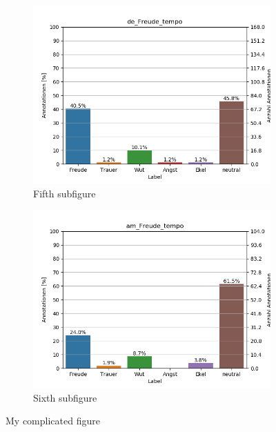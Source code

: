 \documentclass[11pt,a4paper,headsepline,twoside,toc=bibliography]{scrreprt}
\begin{document}
\begin{figure}[t!]
	\medskip
	\begin{subfigure}{0.48\textwidth}
		\includegraphics[width=\linewidth]{plots/de_Freude_tempo.png}
		\caption{Fifth subfigure} \label{fig:de_F_tempo}
	\end{subfigure}\hspace*{\fill}
	\begin{subfigure}{0.48\textwidth}
		\includegraphics[width=\linewidth]{plots/am_Freude_tempo.png}
		\caption{Sixth subfigure} \label{fig:am_F_tempo}
	\end{subfigure}
	
	\caption{My complicated figure} \label{fig:countplots_F}
\end{figure}
\end{document}
